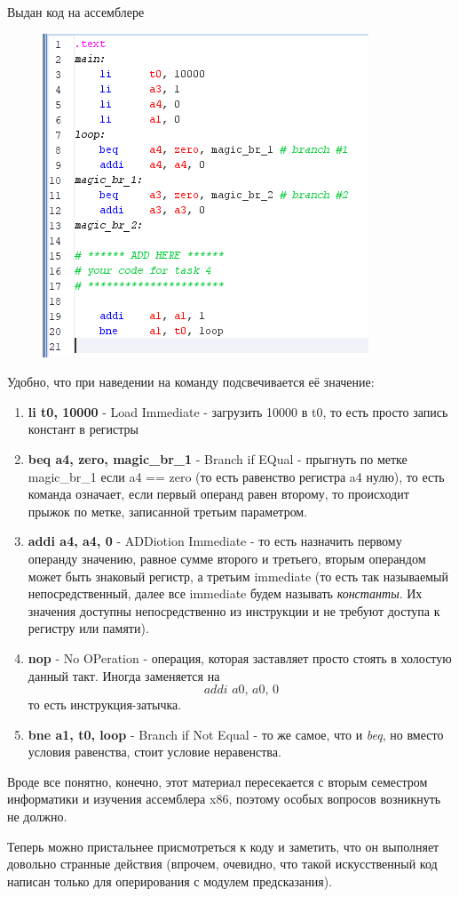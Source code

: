Выдан код на ассемблере
\begin{figure}[H]
    \centering
    \includegraphics[width=0.5\linewidth]{Part1/code.png}
\end{figure}
Удобно, что при наведении на команду подсвечивается её значение:
\begin{enumerate}
    \item \textbf{li      t0, 10000} - Load Immediate - загрузить 10000 в t0, то есть просто запись констант в регистры
    \item \textbf{beq     a4, zero, magic\_br\_1} - Branch if EQual - прыгнуть по метке magic\_br\_1 если a4 == zero (то есть равенство регистра a4 нулю), то есть команда означает, если первый операнд равен второму, то происходит прыжок по метке, записанной третьим параметром.
    \item \textbf{addi    a4, a4, 0} - ADDiotion Immediate - то есть назначить первому операнду значению, равное сумме второго и третьего, вторым операндом может быть знаковый регистр, а третьим immediate (то есть так называемый непосредственный, далее все immediate будем называть \textit{константы}. Их значения доступны непосредственно из инструкции и не требуют доступа к регистру или памяти).
    \item \textbf{nop} - No OPeration - операция, которая заставляет просто стоять в холостую данный такт. Иногда заменяется на
\[\textit{addi    a0, a0, 0}\]
то есть инструкция-затычка.
    \item \textbf{bne     a1, t0, loop} - Branch if Not Equal - то же самое, что и \textit{beq}, но вместо условия равенства, стоит условие неравенства.
\end{enumerate}
Вроде все понятно, конечно, этот материал пересекается с вторым семестром информатики и изучения ассемблера x86, поэтому особых вопросов возникнуть не должно.

Теперь можно пристальнее присмотреться к коду и заметить, что он выполняет довольно странные действия (впрочем, очевидно, что такой искусственный код написан только для оперирования с модулем предсказания).

